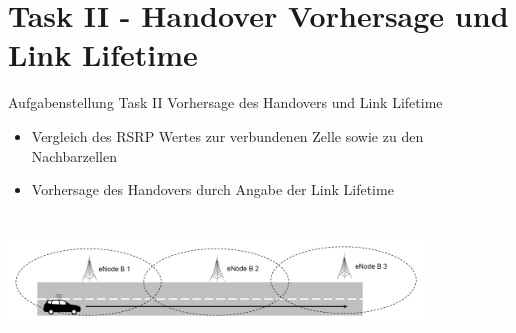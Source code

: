 \section{Task II - Handover Vorhersage und Link Lifetime}
\begin{frame}{Aufgabenstellung Task II}
Vorhersage des Handovers und Link Lifetime
	\begin{itemize}
		\item Vergleich des RSRP Wertes zur verbundenen Zelle sowie zu den Nachbarzellen
		\item Vorhersage des Handovers durch Angabe der Link Lifetime
	\end{itemize}

\quad\\

\includegraphics[width = 11cm]{taskII}
\end{frame}